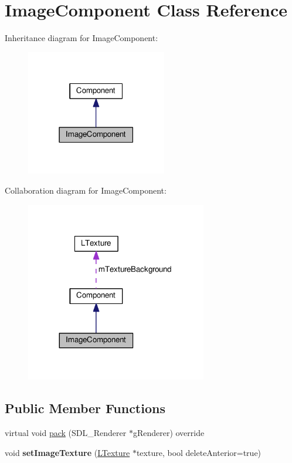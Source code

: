 \hypertarget{class_image_component}{}\section{Image\+Component Class Reference}
\label{class_image_component}


Inheritance diagram for Image\+Component\+:\nopagebreak
\begin{figure}[H]
\begin{center}
\leavevmode
\includegraphics[width=174pt]{class_image_component__inherit__graph}
\end{center}
\end{figure}


Collaboration diagram for Image\+Component\+:\nopagebreak
\begin{figure}[H]
\begin{center}
\leavevmode
\includegraphics[width=224pt]{class_image_component__coll__graph}
\end{center}
\end{figure}
\subsection*{Public Member Functions}
\begin{DoxyCompactItemize}
\item 
virtual void \hyperlink{class_image_component_a538cae4b9b1f723fa6cb21038387a0f6}{pack} (S\+D\+L\+\_\+\+Renderer $\ast$g\+Renderer) override
\item 
void {\bfseries set\+Image\+Texture} (\hyperlink{class_l_texture}{L\+Texture} $\ast$texture, bool delete\+Anterior=true)\hypertarget{class_image_component_aab7a7fe8608766fa1d6414ce5b4b8281}{}\label{class_image_component_aab7a7fe8608766fa1d6414ce5b4b8281}

\end{DoxyCompactItemize}
